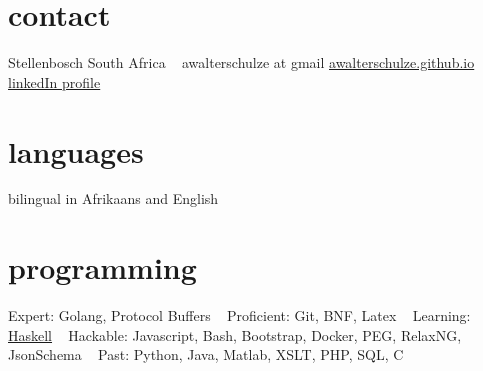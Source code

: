 \documentclass[print]{friggeri-cv} %
\begin{document}

\begin{aside} %
\section{contact}
Stellenbosch
South Africa
~
awalterschulze at gmail
\href{http://awalterschulze.github.io}{awalterschulze.github.io}
\href{https://za.linkedin.com/in/schulzewalter}{linkedIn profile}
\section{languages}
bilingual in Afrikaans and English
\section{programming}
%
Expert: 
Golang, Protocol Buffers
~
Proficient: 
Git, BNF, Latex
~
Learning: 
\href{https://trello.com/b/ij35amXZ/mylearninghaskell}{Haskell}
~
Hackable:
Javascript, Bash, Bootstrap, Docker, PEG, RelaxNG, JsonSchema
~
Past:
Python, Java, Matlab, XSLT, PHP, SQL, C
\end{aside}
\end{document}
